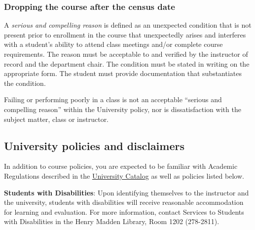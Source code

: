 \hypertarget{dropping-the-course-after-the-census-date}{%
\subsubsection{Dropping the course after the census
date}\label{dropping-the-course-after-the-census-date}}

A \emph{serious and compelling reason} is defined as an unexpected
condition that is not present prior to enrollment in the course that
unexpectedly arises and interferes with a student's ability to attend
class meetings and/or complete course requirements. The reason must be
acceptable to and verified by the instructor of record and the
department chair. The condition must be stated in writing on the
appropriate form. The student must provide documentation that
substantiates the condition.

Failing or performing poorly in a class is not an acceptable ``serious
and compelling reason'' within the University policy, nor is
dissatisfaction with the subject matter, class or instructor.

\hypertarget{university-policies-and-disclaimers}{%
\subsection{University policies and
disclaimers}\label{university-policies-and-disclaimers}}

In addition to course policies, you are expected to be familiar with
Academic Regulations described in the
\href{http://www.fresnostate.edu/catalog/academic-regulations/}{University
Catalog} as well as policies listed below.

\textbf{Students with Disabilities}: Upon identifying themselves to the
instructor and the university, students with disabilities will receive
reasonable accommodation for learning and evaluation. For more
information, contact Services to Students with Disabilities in the Henry
Madden Library, Room 1202 (278-2811).

